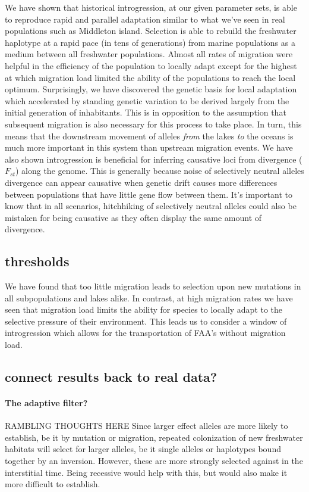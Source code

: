 \documentclass{article}
\begin{document}
We have shown that historical introgression, at our given parameter sets, is able to reproduce rapid and parallel adaptation similar to what we've seen in real populations such as Middleton island. 
Selection is able to rebuild the freshwater haplotype at a rapid pace (in tens of generations) from marine populations as a medium between all freshwater populations. 
Almost all rates of migration were helpful in the efficiency of the population to locally adapt except for the highest at which migration load limited the ability of the populations to reach the local optimum. 
Surprisingly, we have discovered the genetic basis for local adaptation which accelerated by standing genetic variation to be derived largely from the initial generation of inhabitants. 
This is in opposition to the assumption that subsequent migration is also necessary for this process to take place.
In turn, this means that the downstream movement of alleles \emph{from} the lakes \emph{to} the oceans is much more important in this system than upstream migration events. 
We have also shown introgression is beneficial for inferring causative loci from divergence ($F_{st}$) along the genome. 
This is generally because noise of selectively neutral alleles divergence can appear causative when genetic drift causes more 
differences between populations that have little gene flow between them.
It's important to know that in all scenarios, hitchhiking of selectively neutral alleles could also be 
mistaken for being causative as they often display the same amount of divergence.

\subsection*{thresholds}

We have found that too little migration leads to selection upon new mutations in all subpopulations and lakes alike. In contrast, at high migration rates we have seen that migration load limits the ability for species to locally adapt to the selective pressure of their environment. This leads us to consider a window of introgression which allows for the transportation of FAA's without migration load. 

\subsection*{connect results back to real data?}

\paragraph{The adaptive filter?}
RAMBLING THOUGHTS HERE
Since larger effect alleles are more likely to establish,
be it by mutation or migration,
repeated colonization of new freshwater habitats will select for larger alleles,
be it single alleles or haplotypes bound together by an inversion.
However, these are more strongly selected against in the interstitial time.
Being recessive would help with this,
but would also make it more difficult to establish.
\end{document}
